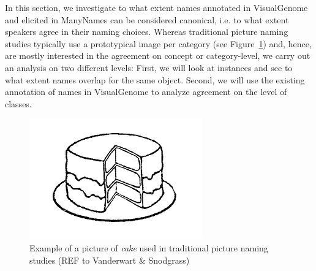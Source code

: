 %


In this section, we investigate to what extent names annotated in VisualGenome and elicited in ManyNames can be considered canonical, i.e. to what extent speakers agree in their naming choices.
Whereas traditional picture naming studies typically use a prototypical image per category (see Figure~\ref{fig:picture_naming}) and, hence, are mostly interested in the agreement on concept or category-level, we carry out an analysis on two different levels: First, we will look at instances and see to what extent names overlap for the same object. 
Second, we will use the existing annotation of names in VisualGenome to analyze agreement on the level of classes.
\begin{figure}[t]
	\centering
	\includegraphics[scale=.5]{figures/snodgrass_vanderwart_cake_042.png}
	\caption{Example of a picture of \textsl{cake} used in traditional picture naming studies (REF to Vanderwart \& Snodgrass) \label{fig:picture_naming}}
\end{figure}

